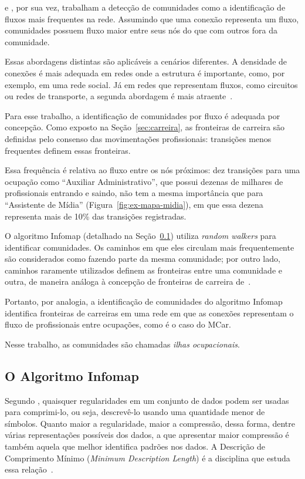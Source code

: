 \documentclass[
  article,
  11pt,
  a4paper,
  english,
  brazil,
  sumario=tradicional]{abntex2}
\begin{document}
 e , por sua vez, trabalham a detecção de comunidades como a identificação de fluxos mais frequentes na rede. Assumindo que uma conexão representa um fluxo, comunidades possuem fluxo maior entre seus nós do que com outros fora da comunidade.

Essas abordagens distintas são aplicáveis a cenários diferentes. A densidade de conexões é mais adequada em redes onde a estrutura é importante, como, por exemplo, em uma rede social. Já em redes que representam fluxos, como circuitos ou redes de transporte, a segunda abordagem é mais atraente~\cite{Rosvall2009-sd}.

Para esse trabalho, a identificação de comunidades por fluxo é adequada por concepção. Como exposto na Seção~\ref{sec:carreira}, as fronteiras de carreira são definidas pelo consenso das movimentações profissionais: transições menos frequentes definem essas fronteiras.

Essa frequência é relativa ao fluxo entre os nós próximos: dez transições para uma ocupação como \enquote{Auxiliar Administrativo}, que possui dezenas de milhares de profissionais entrando e saindo, não tem a mesma importância que para \enquote{Assistente de Mídia} (Figura~\ref{fig:ex-mapa-midia}), em que essa dezena representa mais de 10\% das transições registradas.

O algoritmo Infomap (detalhado na Seção~\ref{sec:infomap}) utiliza \textit{random walkers} para identificar comunidades. Os caminhos em que eles circulam mais frequentemente são considerados como fazendo parte da mesma comunidade; por outro lado, caminhos raramente utilizados definem as fronteiras entre uma comunidade e outra, de maneira análoga à concepção de fronteiras de carreira de~.

Portanto, por analogia, a identificação de comunidades do algoritmo Infomap identifica fronteiras de carreiras em uma rede em que as conexões representam o fluxo de profissionais entre ocupações, como é o caso do MCar.

Nesse trabalho, as comunidades são chamadas \textit{ilhas ocupacionais}.

\subsection{O Algoritmo Infomap} \label{sec:infomap}

Segundo , quaisquer regularidades em um conjunto de dados podem ser usadas para comprimi-lo, ou seja, descrevê-lo usando uma quantidade menor de símbolos. Quanto maior a regularidade, maior a compressão, dessa forma, dentre várias representações possíveis dos dados, a que apresentar maior compressão é também aquela que melhor identifica padrões nos dados. A Descrição de Comprimento Mínimo (\textit{Minimum Description Length}) é a disciplina que estuda essa relação~\cite{Grunwald2007-bt}.
\end{document}
